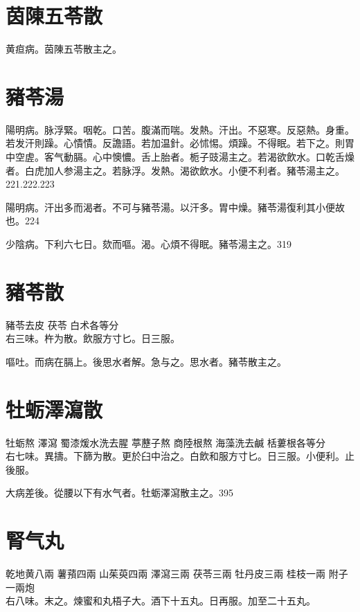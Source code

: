 \section{茵陳五苓散}

黄疸病。茵陳五苓散主之。

\section{豬苓湯}

陽明病。脉浮緊。咽乾。口苦。腹滿而喘。发熱。汗出。不惡寒。反惡熱。身重。若发汗則躁。心憒憒。反譫語。若加温針。必怵惕。煩躁。不得眠。若下之。則胃中空虗。客气動膈。心中懊憹。舌上胎者。栀子{\khaaitp 豉}湯主之。若渴欲飲水。口乾舌燥者。白虎{\khaaitp 加人参}湯主之。若脉浮。发熱。渴欲飲水。小便不利者。豬苓湯主之。221.222.223

陽明病。汗出多而渴者。不可与豬苓湯。以汗多。胃中燥。豬苓湯復利其小便故也。224

少陰病。下利六七日。欬而嘔。渴。心煩不得眠。豬苓湯主之。319

\section{豬苓散}

豬苓{\scriptsize\khaaitp 去皮} 茯苓{ }白术{\scriptsize 各等分}\\
右三味。杵为散。飲服方寸匕。日三服。

嘔吐。而病在膈上。後思水者解。急与之。思水者。豬苓散主之。

\section{牡蛎澤瀉散}

牡蛎{\scriptsize 熬} 澤瀉 蜀漆{\scriptsize 煖水洗去腥} 葶藶子{\scriptsize 熬} 商陸根{\scriptsize 熬} 海藻{\scriptsize 洗去鹹} 栝蔞根{\scriptsize 各等分}\\
右七味。異擣。下篩为散。更於臼中治之。白飲和服方寸匕。日三服。小便利。止後服。

大病差後。從腰以下有水气者。牡蛎澤瀉散主之。395

\section{腎气丸}

乾地黄{\scriptsize 八兩} 薯蕷{\scriptsize 四兩} 山茱萸{\scriptsize 四兩} 澤瀉{\scriptsize 三兩} 茯苓{\scriptsize 三兩} 牡丹皮{\scriptsize 三兩} 桂枝{\scriptsize 一兩} 附子{\scriptsize 一兩炮}\\
右八味。末之。煉蜜和丸梧子大。酒下十五丸。日再服。{\khaaitp 加至二十五丸。}

